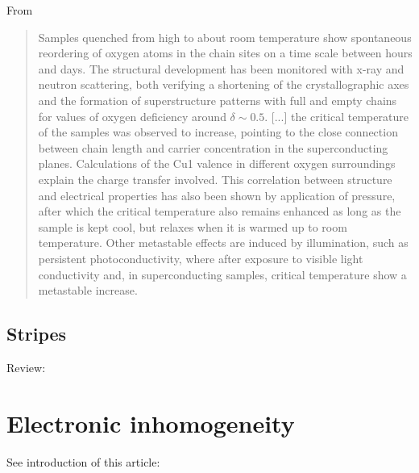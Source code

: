 From \cite{Bahrs2004}

\begin{quote}
Samples quenched from high to about room temperature show spontaneous reordering of oxygen atoms in the chain sites on a time scale between hours and days. 
The structural development has been monitored with x-ray and neutron scattering, both verifying a shortening of the crystallographic axes and the formation of superstructure patterns with full and empty chains for values of oxygen deficiency around $\delta \sim  0.5$. 
[...] the critical temperature of the samples was observed to increase, pointing to the close connection between chain length and carrier concentration in the superconducting planes. 
Calculations of the Cu1 valence in different oxygen surroundings explain the charge transfer involved. 
This correlation between structure and electrical properties has also been shown by application of pressure, after which the critical temperature also remains enhanced as long as the sample is kept cool, but relaxes when it is warmed up to room temperature. 
Other metastable effects are induced by illumination, such as persistent photoconductivity, where after exposure to visible light conductivity and, in superconducting samples, critical temperature show a metastable increase.
\end{quote}

\subsection{Stripes}

Review: \cite{Kivelson2003}

\section{Electronic inhomogeneity}


See introduction of this article: \cite{Ivanov1995}

